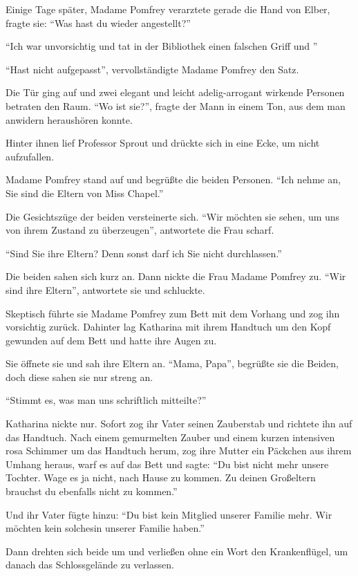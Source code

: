 Einige Tage später, Madame Pomfrey verarztete gerade die Hand von Elber, fragte sie: \enquote{Was hast du wieder angestellt?}

\enquote{Ich war unvorsichtig und tat in der Bibliothek einen falschen Griff und \gst}

\enquote{Hast nicht aufgepasst}, vervollständigte Madame Pomfrey den Satz.

Die Tür ging auf und zwei elegant und leicht adelig-arrogant wirkende Personen betraten den Raum. \enquote{Wo ist sie?}, fragte der Mann in einem Ton, aus dem man anwidern heraushören konnte.

Hinter ihnen lief Professor Sprout und drückte sich in eine Ecke, um nicht aufzufallen.

Madame Pomfrey stand auf und begrüßte die beiden Personen. \enquote{Ich nehme an, Sie sind die Eltern von Miss Chapel.}

Die Gesichtszüge der beiden versteinerte sich. \enquote{Wir möchten sie sehen, um uns von ihrem Zustand zu überzeugen}, antwortete die Frau scharf.

\enquote{Sind Sie ihre Eltern? Denn sonst darf ich Sie nicht durchlassen.}

Die beiden sahen sich kurz an. Dann nickte die Frau Madame Pomfrey zu. \enquote{Wir sind ihre Eltern}, antwortete sie und schluckte.

Skeptisch führte sie Madame Pomfrey zum Bett mit dem Vorhang und zog ihn vorsichtig zurück. Dahinter lag Katharina mit ihrem Handtuch um den Kopf gewunden auf dem Bett und hatte ihre Augen zu.

Sie öffnete sie und sah ihre Eltern an. \enquote{Mama, Papa}, begrüßte sie die Beiden, doch diese sahen sie nur streng an.

\enquote{Stimmt es, was man uns schriftlich mitteilte?}

Katharina nickte nur. Sofort zog ihr Vater seinen Zauberstab und richtete ihn auf das Handtuch. Nach einem gemurmelten Zauber und einem kurzen intensiven rosa Schimmer um das Handtuch herum,  zog ihre Mutter ein Päckchen aus ihrem Umhang heraus, warf es auf das Bett und sagte: \enquote{Du bist nicht mehr unsere Tochter. Wage es ja nicht, nach Hause zu kommen. Zu deinen Großeltern brauchst du ebenfalls nicht zu kommen.}

Und ihr Vater fügte hinzu: \enquote{Du bist kein Mitglied unserer Familie mehr. Wir möchten kein solches\abs in unserer Familie haben.}

Dann drehten sich beide um und verließen ohne ein Wort den Krankenflügel, um danach das Schlossgelände zu verlassen.

